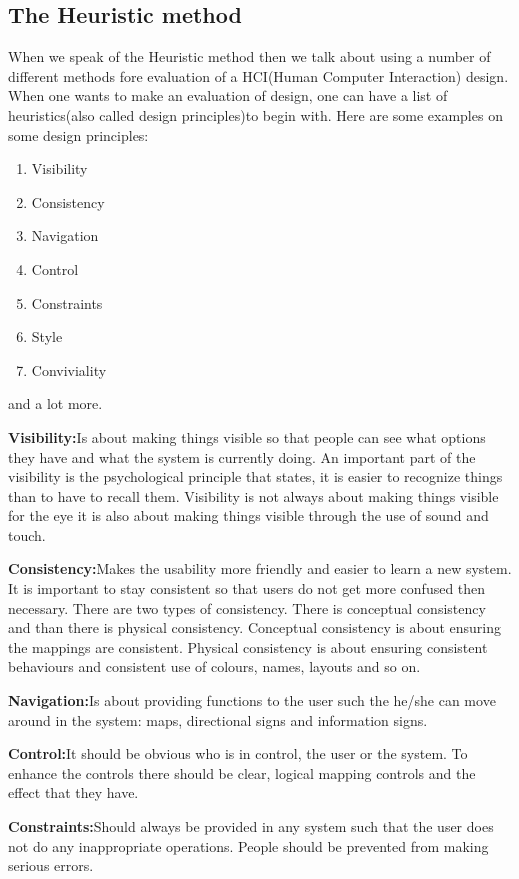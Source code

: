 \subsection{The Heuristic method}
When we speak of the Heuristic method then we talk about using a number of different methods fore evaluation of a HCI(Human Computer Interaction) design. When one wants to make an evaluation of design, one can have a list of heuristics(also called design principles)to begin with. Here are some examples on some design principles:
\begin{enumerate}
\item Visibility
\item Consistency
\item Navigation
\item Control
\item Constraints
\item Style
\item Conviviality
\end{enumerate}
and a lot more.

\textbf{Visibility:}Is about making things visible so that people can see what options they have and what the system is currently doing. An important part of the visibility is the psychological principle that states, it is easier to recognize things than to have to recall them. Visibility is not always about making things visible for the eye it is also about making things visible through the use of sound and touch.

\textbf{Consistency:}Makes the usability more friendly and easier to learn a new system. It is important to stay consistent so that users do not get more confused then necessary. There are two types of consistency. There is conceptual consistency and than there is physical consistency. Conceptual consistency is about ensuring the mappings are consistent. Physical consistency is about ensuring consistent behaviours and consistent use of colours, names, layouts and so on.

\textbf{Navigation:}Is about providing functions to the user such the he/she can move around in the system: maps, directional signs and information signs.

\textbf{Control:}It should be obvious who is in control, the user or the system. To enhance the controls there should be clear, logical mapping controls and the effect that they have.

\textbf{Constraints:}Should always be provided in any system such that the user does not do any inappropriate operations. People should be prevented from making serious errors.


